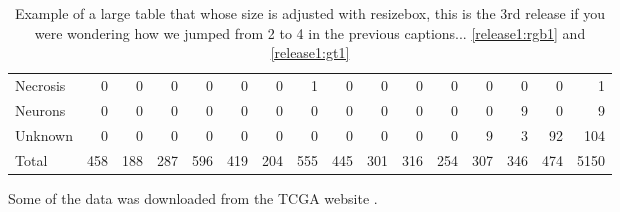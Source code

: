\begin{table}
\begin{center}
{\begin{tabular}{l|rrrrrrrrrrrrrr|r}
            Necrosis   &        0 &        0 &        0 &        0 &        0 &        0 &        1 &        0 &        0 &        0 &        0 &        0 &        0 &        0 &      1 \\
            Neurons &        0 &        0 &        0 &        0 &        0 &        0 &        0 &        0 &        0 &        0 &        0 &        0 &        9 &        0 &      9 \\
            Unknown   &        0 &        0 &        0 &        0 &        0 &        0 &        0 &        0 &        0 &        0 &        0 &        9 &        3 &       92 &    104 \\
            \hline
            Total     &      458 &      188 &      287 &      596 &      419 &      204 &      555 &      445 &      301 &      316 &      254 &      307 &      346 &      474 &   5150 \\
            \hline
            \end{tabular}%
}
    \end{center}
    \caption{Example of a large table that whose size is adjusted with resizebox, this is the 3rd release if you were wondering how we jumped from 2 to 4 in the previous captions... \ref{release1:rgb1} and \ref{release1:gt1}}
    \label{table:full_type_table}
\end{table}


Some of the data was downloaded from the TCGA website \cite{TCGAwebsite}.
